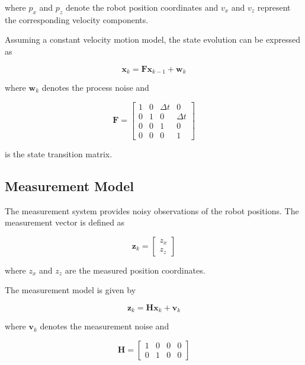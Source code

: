 \documentclass[conference]{IEEEtran}
\begin{document}
where $p_x$ and $p_z$ denote the robot position coordinates and $v_x$ and $v_z$ represent the corresponding velocity components.

Assuming a constant velocity motion model, the state evolution can be expressed as

\begin{equation}
\mathbf{x}_k=
\mathbf{F}\mathbf{x}_{k-1}
+
\mathbf{w}_k
\end{equation}

where $\mathbf{w}_k$ denotes the process noise and

\begin{equation}
\mathbf{F}
=
\begin{bmatrix}
1 & 0 & \Delta t & 0\\
0 & 1 & 0 & \Delta t\\
0 & 0 & 1 & 0\\
0 & 0 & 0 & 1
\end{bmatrix}
\end{equation}

is the state transition matrix.

\subsection{Measurement Model}

The measurement system provides noisy observations of the robot positions. The measurement vector is defined as

\begin{equation}
\mathbf{z}_k=
\begin{bmatrix}
z_x\\
z_z
\end{bmatrix}
\end{equation}

where $z_x$ and $z_z$ are the measured position coordinates.

The measurement model is given by

\begin{equation}
\mathbf{z}_k
=
\mathbf{H}\mathbf{x}_k
+
\mathbf{v}_k
\end{equation}

where $\mathbf{v}_k$ denotes the measurement noise and

\begin{equation}
\mathbf{H}
=
\begin{bmatrix}
1 & 0 & 0 & 0\\
0 & 1 & 0 & 0
\end{bmatrix}
\end{equation}
\end{document}
